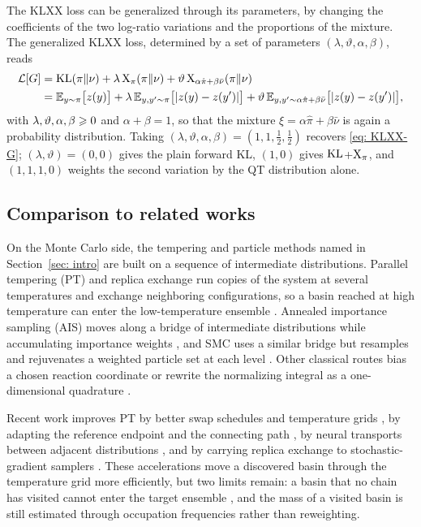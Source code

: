 \documentclass{article}
\begin{document}
The KLXX loss can be generalized through its parameters, by changing the coefficients of the two log-ratio variations and the proportions of the mixture. The generalized KLXX loss, determined by a set of parameters $(\lambda,\vartheta,\alpha,\beta)$, reads
\begin{align}
	\mathcal L[G] & = \mathrm{KL}(\pi\|\nu) + \lambda\,\mathrm{X}_\pi(\pi\|\nu) + \vartheta\,\mathrm{X}_{\alpha\hat\pi+\beta\bar\nu}(\pi\|\nu) \notag \\
	& = \mathbb E_{y\sim\pi}\big[z(y)\big] +  \lambda\, \mathbb E_{y,y'\sim\pi}\big[|z(y)-z(y')|\big] + \vartheta\, \mathbb E_{y,y'\sim \alpha\hat\pi+\beta\bar\nu}\big[|z(y)-z(y')|\big],
	\label{eq: KLXX-general}
\end{align}
with $\lambda,\vartheta,\alpha,\beta\geqslant0$ and $\alpha+\beta=1$, so that the mixture $\xi = \alpha\hat\pi+\beta\bar\nu$ is again a probability distribution. Taking $(\lambda,\vartheta,\alpha,\beta)=(1,1,\tfrac12,\tfrac12)$ recovers \eqref{eq: KLXX-G}; $(\lambda,\vartheta)=(0,0)$ gives the plain forward KL, $(1,0)$ gives $\mathrm{KL}$+$\mathrm{X}_\pi$, and $(1,1,1,0)$ weights the second variation by the QT distribution alone.

\subsection{Comparison to related works}
\label{subsec: loss-related}

On the Monte Carlo side, the tempering and particle methods named in Section~\ref{sec: intro} are built on a sequence of intermediate distributions. Parallel tempering (PT) and replica exchange run copies of the system at several temperatures and exchange neighboring configurations, so a basin reached at high temperature can enter the low-temperature ensemble \citep{swendsen1986replica,geyer1991markov,hukushima1996exchange}. Annealed importance sampling (AIS) moves along a bridge of intermediate distributions while accumulating importance weights \citep{neal2001annealed}, and SMC uses a similar bridge but resamples and rejuvenates a weighted particle set at each level \citep{doucet2001introduction,delmoral2006sequential}. Other classical routes bias a chosen reaction coordinate \citep{torrie1977umbrella,kastner2011umbrella} or rewrite the normalizing integral as a one-dimensional quadrature \citep{skilling2006nested}.

Recent work improves PT by better swap schedules and temperature grids \citep{syed2022nonreversible}, by adapting the reference endpoint and the connecting path \citep{surjanovic2022variational}, by neural transports between adjacent distributions \citep{zhang2025accelerated}, and by carrying replica exchange to stochastic-gradient samplers \citep{chen2019accelerating,deng2020nonconvex,deng2021variance,dong2021replica}. These accelerations move a discovered basin through the temperature grid more efficiently, but two limits remain: a basin that no chain has visited cannot enter the target ensemble \citep{woodard2009conditions,chehab2024provable}, and the mass of a visited basin is still estimated through occupation frequencies rather than reweighting.
\end{document}
